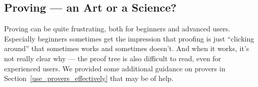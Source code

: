 \subsection{Proving --- an Art or a Science?}
\label{tut_proving_an_art_or_a_science}

Proving can be quite frustrating, both for beginners and advanced users.  Especially beginners sometimes get the impression that proofing is just ``clicking around'' that sometimes works and sometimes doesn't.  And when it works, it's not really clear why --- the proof tree is also difficult to read, even for experienced users.  We provided some additional guidance on provers in Section~\ref{use_provers_effectively} that may be of help.


